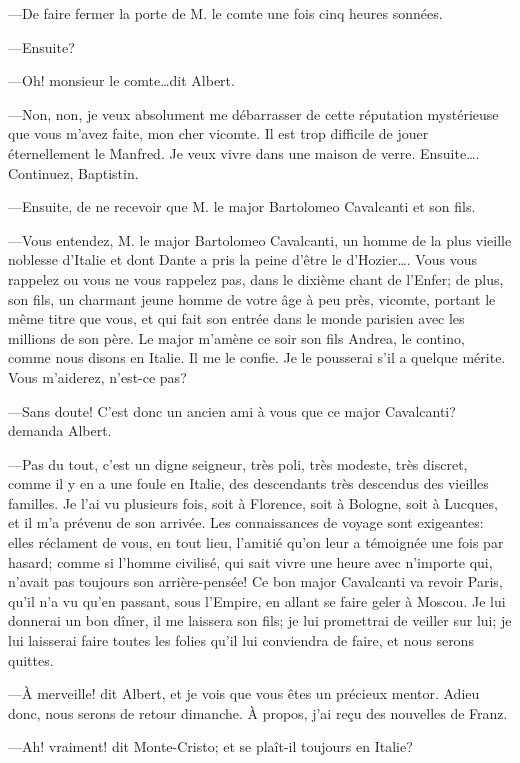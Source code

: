 —De faire fermer la porte de M. le comte une fois cinq heures sonnées. 

—Ensuite? 

—Oh! monsieur le comte\dots dit Albert. 

—Non, non, je veux absolument me débarrasser de cette réputation mystérieuse que vous m'avez faite, mon cher vicomte. Il est trop difficile de jouer éternellement le Manfred. Je veux vivre dans une maison de verre. Ensuite\dots. Continuez, Baptistin. 

—Ensuite, de ne recevoir que M. le major Bartolomeo Cavalcanti et son fils. 

—Vous entendez, M. le major Bartolomeo Cavalcanti, un homme de la plus vieille noblesse d'Italie et dont Dante a pris la peine d'être le d'Hozier\dots. Vous vous rappelez ou vous ne vous rappelez pas, dans le dixième chant de l'Enfer; de plus, son fils, un charmant jeune homme de votre âge à peu près, vicomte, portant le même titre que vous, et qui fait son entrée dans le monde parisien avec les millions de son père. Le major m'amène ce soir son fils Andrea, le contino, comme nous disons en Italie. Il me le confie. Je le pousserai s'il a quelque mérite. Vous m'aiderez, n'est-ce pas? 

—Sans doute! C'est donc un ancien ami à vous que ce major Cavalcanti? demanda Albert. 

—Pas du tout, c'est un digne seigneur, très poli, très modeste, très discret, comme il y en a une foule en Italie, des descendants très descendus des vieilles familles. Je l'ai vu plusieurs fois, soit à Florence, soit à Bologne, soit à Lucques, et il m'a prévenu de son arrivée. Les connaissances de voyage sont exigeantes: elles réclament de vous, en tout lieu, l'amitié qu'on leur a témoignée une fois par hasard; comme si l'homme civilisé, qui sait vivre une heure avec n'importe qui, n'avait pas toujours son arrière-pensée! Ce bon major Cavalcanti va revoir Paris, qu'il n'a vu qu'en passant, sous l'Empire, en allant se faire geler à Moscou. Je lui donnerai un bon dîner, il me laissera son fils; je lui promettrai de veiller sur lui; je lui laisserai faire toutes les folies qu'il lui conviendra de faire, et nous serons quittes. 

—À merveille! dit Albert, et je vois que vous êtes un précieux mentor. Adieu donc, nous serons de retour dimanche. À propos, j'ai reçu des nouvelles de Franz. 

—Ah! vraiment! dit Monte-Cristo; et se plaît-il toujours en Italie? 

